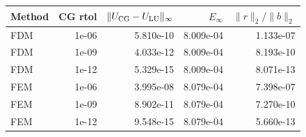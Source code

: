 \begin{tabular}{lrrrr}
\toprule
Method & CG rtol & $\|U_{\rm CG}-U_{\rm LU}\|_\infty$ & $E_\infty$ & $\|r\|_2/\|b\|_2$\\
\midrule
FDM & 1e-06 & 5.810e-10 & 8.009e-04 & 1.133e-07\\
FDM & 1e-09 & 4.033e-12 & 8.009e-04 & 8.193e-10\\
FDM & 1e-12 & 5.329e-15 & 8.009e-04 & 8.071e-13\\
FEM & 1e-06 & 3.995e-08 & 8.079e-04 & 7.398e-07\\
FEM & 1e-09 & 8.902e-11 & 8.079e-04 & 7.270e-10\\
FEM & 1e-12 & 9.548e-15 & 8.079e-04 & 5.660e-13\\
\bottomrule
\end{tabular}
